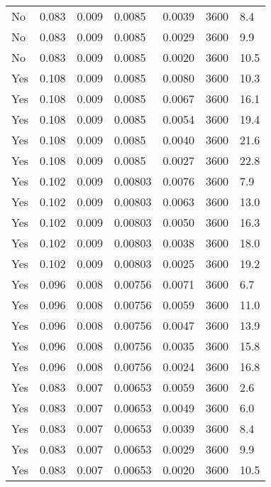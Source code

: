 \begin{longtable}{p{}C{0.10\textwidth}C{0.10\textwidth}C{0.10\textwidth}C{0.10\textwidth}C{0.10\textwidth}C{0.10\textwidth}}
    No & 0.083 & 0.009 & 0.0085 & 0.0039 & 3600 & 8.4 \\
    No & 0.083 & 0.009 & 0.0085 & 0.0029 & 3600 & 9.9 \\
    No & 0.083 & 0.009 & 0.0085 & 0.0020 & 3600 & 10.5 \\
    Yes & 0.108 & 0.009 & 0.0085 & 0.0080 & 3600 & 10.3 \\
    Yes & 0.108 & 0.009 & 0.0085 & 0.0067 & 3600 & 16.1 \\
    Yes & 0.108 & 0.009 & 0.0085 & 0.0054 & 3600 & 19.4 \\
    Yes & 0.108 & 0.009 & 0.0085 & 0.0040 & 3600 & 21.6 \\
    Yes & 0.108 & 0.009 & 0.0085 & 0.0027 & 3600 & 22.8 \\
    Yes & 0.102 & 0.009 & 0.00803 & 0.0076 & 3600 & 7.9 \\
    Yes & 0.102 & 0.009 & 0.00803 & 0.0063 & 3600 & 13.0 \\
    Yes & 0.102 & 0.009 & 0.00803 & 0.0050 & 3600 & 16.3 \\
    Yes & 0.102 & 0.009 & 0.00803 & 0.0038 & 3600 & 18.0 \\
    Yes & 0.102 & 0.009 & 0.00803 & 0.0025 & 3600 & 19.2 \\
    Yes & 0.096 & 0.008 & 0.00756 & 0.0071 & 3600 & 6.7 \\
    Yes & 0.096 & 0.008 & 0.00756 & 0.0059 & 3600 & 11.0 \\
    Yes & 0.096 & 0.008 & 0.00756 & 0.0047 & 3600 & 13.9 \\
    Yes & 0.096 & 0.008 & 0.00756 & 0.0035 & 3600 & 15.8 \\
    Yes & 0.096 & 0.008 & 0.00756 & 0.0024 & 3600 & 16.8 \\
    Yes & 0.083 & 0.007 & 0.00653 & 0.0059 & 3600 & 2.6 \\
    Yes & 0.083 & 0.007 & 0.00653 & 0.0049 & 3600 & 6.0 \\
    Yes & 0.083 & 0.007 & 0.00653 & 0.0039 & 3600 & 8.4 \\
    Yes & 0.083 & 0.007 & 0.00653 & 0.0029 & 3600 & 9.9 \\
    Yes & 0.083 & 0.007 & 0.00653 & 0.0020 & 3600 & 10.5 \\
    \bottomrule
\end{longtable}


